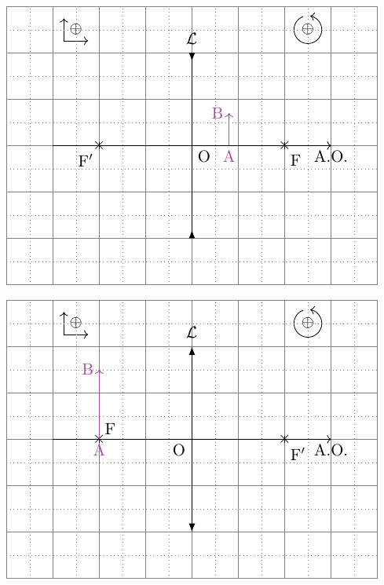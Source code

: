 \documentclass[../../main/main.tex]{subfiles}
\begin{document}
\begin{tcb}[label=impo:cons_exem]
\begin{minipage}{0.50\linewidth}
\begin{center}
			\label{fig:convconstruafter}
		\end{center}
	\end{minipage}
	\begin{minipage}{0.50\linewidth}
		\begin{center}
			\includegraphics[width=\linewidth]{lent_div-constru_after_a-plain}
			\label{fig:divconstruafter}
		\end{center}
	\end{minipage}
	\hfill
	\begin{minipage}{0.50\linewidth}
		\begin{center}
			\includegraphics[width=\linewidth]{lent_conv-constru_F-plain}
			\label{fig:convconstruF}
		\end{center}
	\end{minipage}
\end{tcb}
\end{document}
